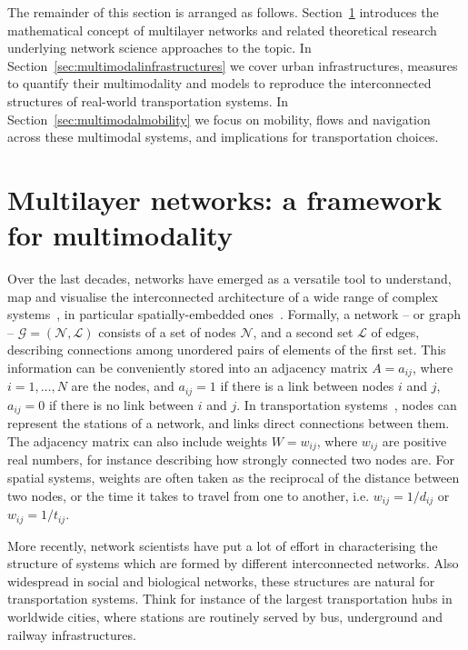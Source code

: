 The remainder of this section is arranged as follows. Section~\ref{sec:multilayernetworks} introduces the mathematical concept of multilayer networks and related theoretical research underlying network science approaches to the topic. In Section~\ref{sec:multimodalinfrastructures} we cover urban infrastructures, measures to quantify their multimodality and models to reproduce the interconnected structures of real-world transportation systems. In Section~\ref{sec:multimodalmobility} we focus on mobility, flows and navigation across these multimodal systems, and implications for transportation choices. %

\section{Multilayer networks: a framework for multimodality}\label{sec:multilayernetworks}

Over the last decades, networks have emerged as a versatile tool to understand, map and visualise the interconnected architecture of a wide range of complex systems~\cite{albert2002statistical,dorogovtsev2002evolution, newman2003structure, boccaletti2006complex}, in particular spatially-embedded ones~\cite{barthelemy2011spatial}. Formally, a network -- or graph -- $\mathcal G = (\mathcal N, \mathcal L)$ consists of a set of nodes $\mathcal N$, and a second set $\mathcal L$ of edges, describing connections among unordered pairs of elements of the first set. This information can be conveniently stored into an adjacency matrix ${A=a_{ij}}$, where $i=1, \dots, N$ are the nodes, and $a_{ij}=1$ if there is a link between nodes $i$ and $j$, $a_{ij}=0$ if there is no link between $i$ and $j$. In transportation systems~\cite{lin2013complex}, nodes can represent the stations of a network, and links direct connections between them. The adjacency matrix can also include weights $W=w_{ij}$, where $w_{ij}$ are positive real numbers, for instance describing how strongly connected two nodes are. For spatial systems, weights are often taken as the reciprocal of the distance between two nodes, or the time it takes to travel from one to another, i.e. $w_{ij}=1/d_{ij}$ or $w_{ij}=1/t_{ij}$.

More recently, network scientists have put a lot of effort in characterising the structure of systems which are formed by different interconnected networks. Also widespread in social and biological networks, these structures are natural for transportation systems. Think for instance of the largest transportation hubs in worldwide cities, where stations are routinely served by bus, underground and railway infrastructures.

